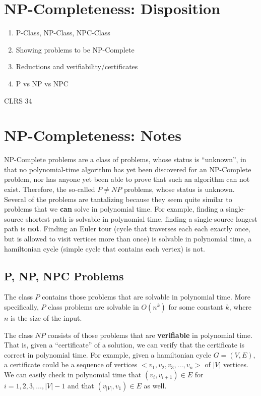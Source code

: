 \section{NP-Completeness: Disposition}
\begin{enumerate}
  \item P-Class, NP-Class, NPC-Class
  \item Showing problems to be NP-Complete
  \item Reductions and verifiability/certificates
  \item P vs NP vs NPC
\end{enumerate}

CLRS 34

\section{NP-Completeness: Notes}
NP-Complete problems are a class of problems, whose status is ``unknown'', in that
no polynomial-time algorithm has yet been discovered for an NP-Complete problem, nor
has anyone yet been able to prove that such an algorithm can not exist. Therefore, the
so-called $P \neq NP$ problems, whose status is unknown. Several of the problems are tantalizing
because they seem quite similar to problems that we \textbf{can} solve in polynomial time. For example,
finding a single-source shortest path is solvable in polynomial time, finding a single-source longest
path is \textbf{not}. Finding an Euler tour (cycle that traverses each each exactly once, but is allowed
to visit vertices more than once) is solvable in polynomial time, a hamiltonian cycle (simple cycle that
contains each vertex) is not.

\subsection{P, NP, NPC Problems}
The class $P$ contains those problems that are solvable in polynomial time. More specifically, $P$ class
problems are solvable in $O(n^k)$ for some constant $k$, where $n$ is the size of the input.

The class $NP$ consists of those problems that are \textbf{verifiable} in polynomial time. That is, given
a ``certificate'' of a solution, we can verify that the certificate is correct in polynomial time. For example,
given a hamiltonian cycle $G = (V,E)$, a certificate could be a sequence of vertices $<v_1, v_2, v_3, \hdots, v_n>$
of $|V|$ vertices. We can easily check in polynomial time that $(v_i, v_{i+1}) \in E$ for $i = 1,2,3,\hdots,|V|-1$
and that $(v_{|V|},v_1) \in E$ as well.

